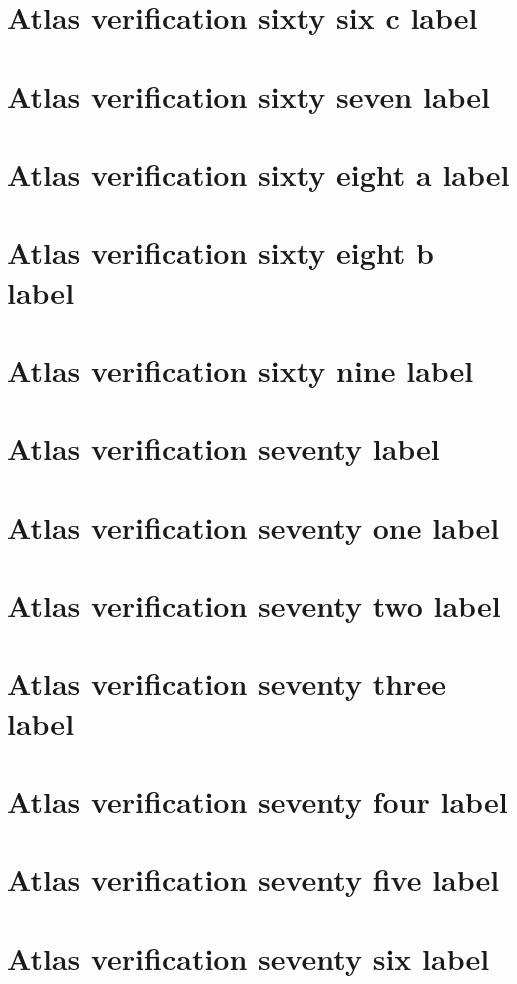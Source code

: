 \documentclass[11pt]{article}
\theoremstyle{definition}
\begin{document}
\section{Atlas verification sixty six c label}
\label{ll:labels:atlas-v66c}
\section{Atlas verification sixty seven label}
\label{ll:labels:atlas-v67}
\section{Atlas verification sixty eight a label}
\label{ll:labels:atlas-v68a}
\section{Atlas verification sixty eight b label}
\label{ll:labels:atlas-v68b}
\section{Atlas verification sixty nine label}
\label{ll:labels:atlas-v69}
\section{Atlas verification seventy label}
\label{ll:labels:atlas-v70}
\section{Atlas verification seventy one label}
\label{ll:labels:atlas-v71}
\section{Atlas verification seventy two label}
\label{ll:labels:atlas-v72}
\section{Atlas verification seventy three label}
\label{ll:labels:atlas-v73}
\section{Atlas verification seventy four label}
\label{ll:labels:atlas-v74}
\section{Atlas verification seventy five label}
\label{ll:labels:atlas-v75}
\section{Atlas verification seventy six label}
\label{ll:labels:atlas-v76}
\end{document}
